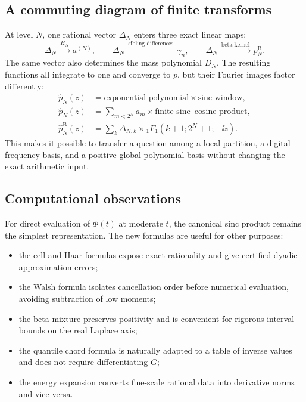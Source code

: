 \documentclass[11pt]{article}
\theoremstyle{definition}
\theoremstyle{remark}
\begin{document}
\subsection{A commuting diagram of finite transforms}

At level $N$, one rational vector $\Delta_N$ enters three exact linear maps:
\begin{equation}\label{p3:eq:commuting-maps}
 \Delta_N
 \xrightarrow{\ H_N\ }a^{(N)},
 \qquad
 \Delta_N\xrightarrow{\ \text{sibling differences}\ }\gamma_n,
 \qquad
 \Delta_N\xrightarrow{\ \text{beta kernel}\ }p_N^{\mathrm B}.
\end{equation}
The same vector also determines the mass polynomial $D_N$.  The resulting
functions all integrate to one and converge to $p$, but their Fourier images
factor differently:
\begin{align}
 \widehat p_N(z)&=\text{exponential polynomial}\times\text{sinc window},
 \label{p3:eq:transform-type-cell}\\
 \widehat p_N(z)&=\sum_{m<2^N}a_m\times\text{finite sine--cosine product},
 \label{p3:eq:transform-type-Walsh}\\
 \widehat p_N^{\mathrm B}(z)&=\sum_k\Delta_{N,k}\times{}_1F_1(k+1;2^N+1;-\ii z).
 \label{p3:eq:transform-type-beta}
\end{align}
This makes it possible to transfer a question among a local partition, a
digital frequency basis, and a positive global polynomial basis without
changing the exact arithmetic input.

\subsection{Computational observations}

For direct evaluation of $\Phi(t)$ at moderate $t$, the canonical sinc product
remains the simplest representation.  The new formulas are useful for other
purposes:
\begin{itemize}
\item the cell and Haar formulas expose exact rationality and give certified
      dyadic approximation errors;
\item the Walsh formula isolates cancellation order before numerical
      evaluation, avoiding subtraction of low moments;
\item the beta mixture preserves positivity and is convenient for rigorous
      interval bounds on the real Laplace axis;
\item the quantile chord formula is naturally adapted to a table of inverse
      values and does not require differentiating $G$;
\item the energy expansion converts fine-scale rational data into derivative
      norms and vice versa.
\end{itemize}
\end{document}
